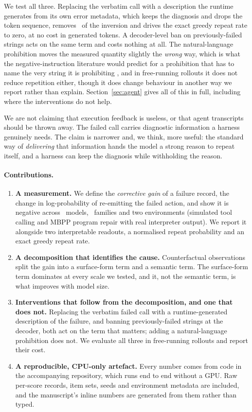 We test all three. Replacing the verbatim call with a description the runtime
generates from its own error metadata, which keeps the diagnosis and drops the
token sequence,
removes \AbstractRemoved\ of the inversion and drives the exact greedy repeat
rate to zero, at no cost in generated tokens. A decoder-level ban on
previously-failed strings acts on the same term and costs nothing at all. The
natural-language prohibition moves the measured quantity slightly the
\emph{wrong} way, which is what the negative-instruction literature would
predict for a prohibition that has to name the very string it is prohibiting
\citep{castricato2024pinkelephants,negation2025pinkelephant}, and in
free-running rollouts it does not reduce repetition either, though it does
change behaviour in another way we report rather than explain.
Section~\ref{sec:agent} gives all of this in full, including where the
interventions do not help.

We are not claiming that execution feedback is useless, or that agent
transcripts should be thrown away. The failed call carries diagnostic
information a harness genuinely needs. The claim is narrower and, we think, more
useful: the standard way of \emph{delivering} that information hands the model a
strong reason to repeat itself, and a harness can keep the diagnosis while
withholding the reason.

\paragraph{Contributions.}
\begin{enumerate}\itemsep2pt
\item \textbf{A measurement.} We define the \emph{corrective gain} of a failure
record, the change in log-probability of re-emitting the failed action, and
show it is negative across \NumModelsToolshed\ models,
\NumFamilies\ families and two environments (simulated tool calling and MBPP
program repair with real interpreter output). We report it alongside two
interpretable readouts, a normalised repeat probability and an exact greedy
repeat rate.
\item \textbf{A decomposition that identifies the cause.} Counterfactual
observations split the gain into a surface-form term and a semantic term. The
surface-form term dominates at every scale we tested, and it, not the semantic
term, is what improves with model size.
\item \textbf{Interventions that follow from the decomposition, and one that
does not.} Replacing the verbatim failed call with a runtime-generated
description of the failure, and banning previously-failed strings at the
decoder, both act on the term that matters; adding a natural-language
prohibition does not. We evaluate all three in free-running rollouts and report
their cost.
\item \textbf{A reproducible, CPU-only artefact.} Every number comes from code
in the accompanying repository, which runs end to end without a GPU. Raw
per-score records, item sets, seeds and environment metadata are included, and
the manuscript's inline numbers are generated from them rather than typed.
\end{enumerate}
